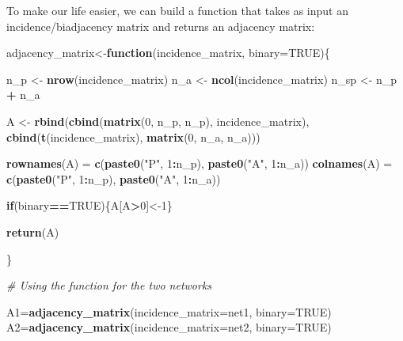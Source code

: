 \documentclass[
]{book}
\newenvironment{Shaded}{\begin{snugshade}}{\end{snugshade}}
\newcommand{\AttributeTok}[1]{\textcolor[rgb]{0.13,0.29,0.53}{#1}}
\newcommand{\CommentTok}[1]{\textcolor[rgb]{0.56,0.35,0.01}{\textit{#1}}}
\newcommand{\ConstantTok}[1]{\textcolor[rgb]{0.56,0.35,0.01}{#1}}
\newcommand{\ControlFlowTok}[1]{\textcolor[rgb]{0.13,0.29,0.53}{\textbf{#1}}}
\newcommand{\DecValTok}[1]{\textcolor[rgb]{0.00,0.00,0.81}{#1}}
\newcommand{\FunctionTok}[1]{\textcolor[rgb]{0.13,0.29,0.53}{\textbf{#1}}}
\newcommand{\NormalTok}[1]{#1}
\newcommand{\OtherTok}[1]{\textcolor[rgb]{0.56,0.35,0.01}{#1}}
\newcommand{\SpecialCharTok}[1]{\textcolor[rgb]{0.81,0.36,0.00}{\textbf{#1}}}
\newcommand{\StringTok}[1]{\textcolor[rgb]{0.31,0.60,0.02}{#1}}
\begin{document}
To make our life easier, we can build a function that takes as input an incidence/biadjacency matrix and returns an adjacency matrix:

\begin{Shaded}
\begin{Highlighting}[]
\NormalTok{adjacency\_matrix}\OtherTok{\textless{}{-}}\ControlFlowTok{function}\NormalTok{(incidence\_matrix, }\AttributeTok{binary=}\ConstantTok{TRUE}\NormalTok{)\{}
  
\NormalTok{  n\_p }\OtherTok{\textless{}{-}} \FunctionTok{nrow}\NormalTok{(incidence\_matrix)}
\NormalTok{  n\_a }\OtherTok{\textless{}{-}} \FunctionTok{ncol}\NormalTok{(incidence\_matrix)}
\NormalTok{  n\_sp }\OtherTok{\textless{}{-}}\NormalTok{ n\_p }\SpecialCharTok{+}\NormalTok{ n\_a}
  
\NormalTok{  A }\OtherTok{\textless{}{-}} \FunctionTok{rbind}\NormalTok{(}\FunctionTok{cbind}\NormalTok{(}\FunctionTok{matrix}\NormalTok{(}\DecValTok{0}\NormalTok{, n\_p, n\_p), incidence\_matrix),}
             \FunctionTok{cbind}\NormalTok{(}\FunctionTok{t}\NormalTok{(incidence\_matrix), }\FunctionTok{matrix}\NormalTok{(}\DecValTok{0}\NormalTok{, n\_a, n\_a)))}
  
  \FunctionTok{rownames}\NormalTok{(A) }\OtherTok{=} \FunctionTok{c}\NormalTok{(}\FunctionTok{paste0}\NormalTok{(}\StringTok{"P"}\NormalTok{, }\DecValTok{1}\SpecialCharTok{:}\NormalTok{n\_p), }\FunctionTok{paste0}\NormalTok{(}\StringTok{"A"}\NormalTok{, }\DecValTok{1}\SpecialCharTok{:}\NormalTok{n\_a))}
  \FunctionTok{colnames}\NormalTok{(A) }\OtherTok{=} \FunctionTok{c}\NormalTok{(}\FunctionTok{paste0}\NormalTok{(}\StringTok{"P"}\NormalTok{, }\DecValTok{1}\SpecialCharTok{:}\NormalTok{n\_p), }\FunctionTok{paste0}\NormalTok{(}\StringTok{"A"}\NormalTok{, }\DecValTok{1}\SpecialCharTok{:}\NormalTok{n\_a))}
  
  \ControlFlowTok{if}\NormalTok{(binary}\SpecialCharTok{==}\ConstantTok{TRUE}\NormalTok{)\{A[A}\SpecialCharTok{\textgreater{}}\DecValTok{0}\NormalTok{]}\OtherTok{\textless{}{-}}\DecValTok{1}\NormalTok{\}}
  
  \FunctionTok{return}\NormalTok{(A)}
  
\NormalTok{\}}

\CommentTok{\# Using the function for the two networks}

\NormalTok{A1}\OtherTok{=}\FunctionTok{adjacency\_matrix}\NormalTok{(}\AttributeTok{incidence\_matrix=}\NormalTok{net1, }\AttributeTok{binary=}\ConstantTok{TRUE}\NormalTok{)}
\NormalTok{A2}\OtherTok{=}\FunctionTok{adjacency\_matrix}\NormalTok{(}\AttributeTok{incidence\_matrix=}\NormalTok{net2, }\AttributeTok{binary=}\ConstantTok{TRUE}\NormalTok{)}
\end{Highlighting}
\end{Shaded}
\end{document}
